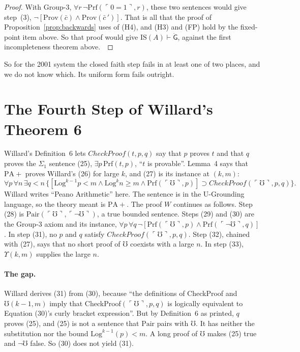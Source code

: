 \documentclass[11pt]{article}
\newcommand{\G}{\ddot{\mathsf{G}}}          %
\newcommand{\contra}{~\text{\Lightning}}  %
\newcommand{\Prov}{\mathrm{Prov}}
\newcommand{\Prf}{\mathrm{Prf}}
\newcommand{\Pair}{\mathrm{Pair}}
\newcommand{\gn}[1]{\ulcorner #1\urcorner}  %
\newcommand{\Mho}{\mho}                     %
\theoremstyle{plain}
\theoremstyle{definition}
\begin{document}
\begin{proof}
With Group-3, $\forall r\,\neg\Prf(\gn{0=1}, r)$, these two sentences would
give step~(3), $\neg[\Prov(\bar c) \wedge \Prov(\bar c\,')]$. That is all
that the proof of Proposition~\ref{prop:backwards} uses of (H4), and (H3) and
(FP) hold by the fixed-point item above. So that proof would give
$\mathrm{IS}(A) \vdash \G$, against the first incompleteness theorem
above.\contra
\end{proof}

\noindent
So for the 2001 system the closed faith step fails in at least one of two
places, and we do not know which. Its uniform form fails outright.

\section{The Fourth Step of Willard's Theorem 6}
\label{app:ns}

Willard's Definition~6 lets $\mathit{CheckProof}(t,p,q)$ say that $p$ proves
$t$ and that $q$ proves the $\Sigma_1$ sentence (25),
$\exists p\,\Prf(t,p)$, ``$t$ is provable''. Lemma~4 says that
$\mathrm{PA}{+}$ proves Willard's (26) for large $k$, and (27) is its instance
at $(k, m)$:
\[
\forall p\,\forall n\,\exists q < n\,\bigl\{[\mathrm{Log}^{k-1} p < m \wedge
\mathrm{Log}^k n \ge m \wedge \Prf(\gn{\Mho}, p)] \supset
\mathit{CheckProof}(\gn{\Mho}, p, q)\bigr\}.
\]
Willard writes ``Peano Arithmetic'' here. The sentence is in the U-Grounding
language, so the theory meant is $\mathrm{PA}{+}$. The proof $W$ continues
as follows. Step (28) is $\Pair(\gn{\Mho}, \gn{\neg\Mho})$, a true bounded
sentence. Steps (29) and (30) are the Group-3 axiom and its instance,
$\forall p\,\forall q\,\neg[\Prf(\gn{\Mho},p) \wedge \Prf(\gn{\neg\Mho},q)]$.
In step (31), no $p$ and $q$ satisfy $\mathit{CheckProof}(\gn{\Mho}, p, q)$.
Step (32), chained with (27), says that no short proof of $\Mho$ coexists
with a large $n$. In step (33), $\Upsilon(k,m)$ supplies the large $n$.

\paragraph{The gap.} Willard derives (31) from (30), because ``the
definitions of CheckProof and $\Mho(k-1,m)$ imply that
CheckProof$(\gn{\Mho}, p, q)$ is logically equivalent to Equation (30)'s
curly bracket expression''. But by Definition~6 as printed, $q$ proves (25),
and (25) is not a sentence that $\Pair$ pairs with $\Mho$. It has neither the
substitution nor the bound $\mathrm{Log}^{k-1}(p) < m$. A long proof of
$\Mho$ makes (25) true and $\neg\Mho$ false. So (30) does not yield (31).
\end{document}
